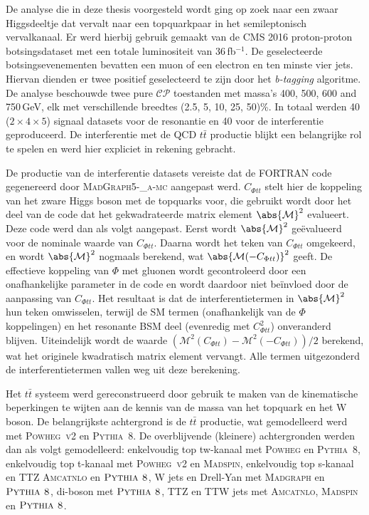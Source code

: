 De analyse die in deze thesis voorgesteld wordt ging op zoek naar een zwaar Higgsdeeltje dat
vervalt naar een topquarkpaar in het semileptonisch vervalkanaal. Er werd
hierbij gebruik gemaakt van de CMS 2016 proton-proton botsingsdataset met een totale 
luminositeit van 36\,fb$^{-1}$. De geselecteerde botsingsevenementen bevatten een
muon of een electron en ten minste vier jets. Hiervan
dienden er twee positief geselecteerd te zijn door het {\it b-tagging}
algoritme. De analyse beschouwde 
twee pure $\mathcal{CP}$ toestanden met massa's 400, 500, 600 and 750\,GeV, elk met
verschillende breedtes (2.5, 5, 10, 25, 50)\%. In totaal werden 40
($2\times 4 \times 5$) signaal datasets voor de resonantie en 40 voor de interferentie
geproduceerd. De interferentie met de QCD $t\bar t$ productie blijkt een
belangrijke rol te spelen en werd hier expliciet in rekening gebracht.  
 
De productie van de interferentie datasets vereiste dat de FORTRAN code gegenereerd
door \textsc{MadGraph5-\_a-mc\@nlo} %
aangepast werd. $C_{\Phi tt}$ stelt hier de
koppeling van het zware Higgs boson met de topquarks voor, die gebruikt wordt door
het deel van de code dat het gekwadrateerde matrix element
$\abs{\mathcal{M}}^2$ evalueert. Deze code werd dan als volgt aangepast. Eerst wordt
$\abs{\mathcal{M}}^2$ ge\"evalueerd voor de nominale waarde van 
$C_{\Phi tt}$. Daarna wordt het teken van $C_{\Phi tt}$ omgekeerd, en wordt
$\abs{\mathcal{M}}^2$ nogmaals berekend, wat 
$\abs{\mathcal{M}(-C_{\Phi tt})}^2$ geeft. De effectieve koppeling van $\Phi$ met gluonen wordt
gecontroleerd door een onafhankelijke parameter in de code en wordt
daardoor niet be\"invloed door de aanpassing van $C_{\Phi tt}$. Het resultaat
is dat de interferentietermen in $\abs{\mathcal{M}}^2$ hun teken omwisselen,
terwijl de SM termen (onafhankelijk van de $\Phi$ koppelingen) en het
resonante BSM deel (evenredig met $C^2_{\Phi tt}$) onveranderd
blijven. Uiteindelijk wordt de waarde $(\mathcal{M}^{2}(C_{\Phi tt}) -
\mathcal{M}^{2}(-C_{\Phi tt})) / 2$ berekend, wat het originele kwadratisch
matrix element vervangt. Alle termen uitgezonderd de interferentietermen
vallen weg uit deze berekening.   

Het $t\bar t$ systeem werd gereconstrueerd door gebruik te maken van de
kinematische beperkingen te wijten aan de kennis van de massa van het topquark en
het W boson. De belangrijkste achtergrond is de $t \bar t$ productie, wat
gemodelleerd werd met \textsc{Powheg~v2} en \textsc{Pythia~8}. De overblijvende
(kleinere) achtergronden werden dan als volgt gemodelleerd: enkelvoudig top tw-kanaal
met  \textsc{Powheg} en \textsc{Pythia~8}, enkelvoudig top t-kanaal met
\textsc{Powheg~v2} en \textsc{Madspin}, enkelvoudig top s-kanaal en TTZ
\textsc{Amcatnlo} en $\textsc{Pythia~8}$, W jets en Drell-Yan met
\textsc{Madgraph} en $\textsc{Pythia~8}$, di-boson met $\textsc{Pythia~8}$,
TTZ en TTW jets met \textsc{Amcatnlo}, \textsc{Madspin} en
$\textsc{Pythia~8}$. 
 
